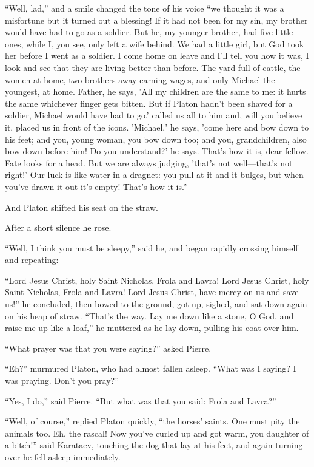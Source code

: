 ``Well, lad,'' and a smile changed the tone of his voice ``we
thought it was a misfortune but it turned out a blessing! If it
had not been for my sin, my brother would have had to go as a
soldier. But he, my younger brother, had five little ones, while
I, you see, only left a wife behind. We had a little girl, but
God took her before I went as a soldier. I come home on leave and
I'll tell you how it was, I look and see that they are living
better than before. The yard full of cattle, the women at home,
two brothers away earning wages, and only Michael the youngest,
at home. Father, he says, 'All my children are the same to me: it
hurts the same whichever finger gets bitten. But if Platon hadn't
been shaved for a soldier, Michael would have had to go.' called
us all to him and, will you believe it, placed us in front of the
icons.  'Michael,' he says, 'come here and bow down to his feet;
and you, young woman, you bow down too; and you, grandchildren,
also bow down before him! Do you understand?' he says. That's how
it is, dear fellow. Fate looks for a head. But we are always
judging, 'that's not well---that's not right!' Our luck is like
water in a dragnet: you pull at it and it bulges, but when you've
drawn it out it's empty! That's how it is.''

And Platon shifted his seat on the straw.

After a short silence he rose.

``Well, I think you must be sleepy,'' said he, and began rapidly
crossing himself and repeating:

``Lord Jesus Christ, holy Saint Nicholas, Frola and Lavra! Lord
Jesus Christ, holy Saint Nicholas, Frola and Lavra! Lord Jesus
Christ, have mercy on us and save us!'' he concluded, then bowed
to the ground, got up, sighed, and sat down again on his heap of
straw. ``That's the way.  Lay me down like a stone, O God, and
raise me up like a loaf,'' he muttered as he lay down, pulling
his coat over him.

``What prayer was that you were saying?'' asked Pierre.

``Eh?'' murmured Platon, who had almost fallen asleep. ``What was
I saying?  I was praying. Don't you pray?''

``Yes, I do,'' said Pierre. ``But what was that you said: Frola
and Lavra?''

``Well, of course,'' replied Platon quickly, ``the horses'
saints. One must pity the animals too. Eh, the rascal! Now you've
curled up and got warm, you daughter of a bitch!'' said Karataev,
touching the dog that lay at his feet, and again turning over he
fell asleep immediately.

